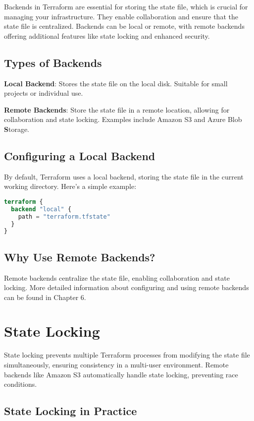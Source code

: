 Backends in Terraform are essential for storing the state file, which is crucial for managing your infrastructure. They enable collaboration and ensure that the state file is centralized. Backends can be local or remote, with remote backends offering additional features like state locking and enhanced security.

\subsection{Types of Backends}

\textbf{Local Backend}: Stores the state file on the local disk. Suitable for small projects or individual use.

\textbf{Remote Backends}: Store the state file in a remote location, allowing for collaboration and state locking. Examples include Amazon S3 and Azure Blob \textbf{S}torage.

\subsection{Configuring a Local Backend}

By default, Terraform uses a local backend, storing the state file in the current working directory. Here's a simple example:

\begin{lstlisting}[language=terraform]
terraform {
  backend "local" {
    path = "terraform.tfstate"
  }
}
\end{lstlisting}

\subsection{Why Use Remote Backends?}

Remote backends centralize the state file, enabling collaboration and state locking. More detailed information about configuring and using remote backends can be found in Chapter 6.

\section{State Locking}

State locking prevents multiple Terraform processes from modifying the state file simultaneously, ensuring consistency in a multi-user environment. Remote backends like Amazon S3 automatically handle state locking, preventing race conditions.

\subsection{State Locking in Practice}


